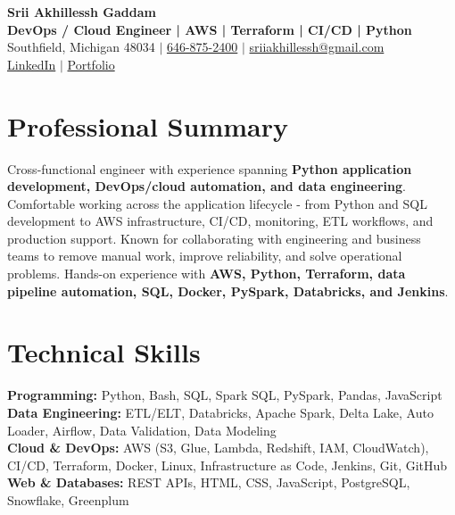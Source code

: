 \documentclass[letterpaper,10pt]{article}
\begin{document}
\fontsize{9.35pt}{10.45pt}\selectfont

\begin{center}
    {\LARGE \textbf{Srii Akhillessh Gaddam}} \\[-1pt]
    \textbf{DevOps / Cloud Engineer | AWS | Terraform | CI/CD | Python} \\[2pt]
    Southfield, Michigan 48034 $|$
    \href{tel:6468752400}{646-875-2400} $|$
    \href{mailto:sriiakhillessh@gmail.com}{sriiakhillessh@gmail.com} \\[1pt]
    \href{https://www.linkedin.com/in/srii-akhiilessh-gaddam-b48668191/}{LinkedIn} $|$
    \href{https://sriiakhillesshg.github.io/portfolio/}{Portfolio}
\end{center}
\vspace{-8pt}

\section{Professional Summary}
\small{Cross-functional engineer with experience spanning \textbf{Python application development, DevOps/cloud automation, and data engineering}. Comfortable working across the application lifecycle - from Python and SQL development to AWS infrastructure, CI/CD, monitoring, ETL workflows, and production support. Known for collaborating with engineering and business teams to remove manual work, improve reliability, and solve operational problems. Hands-on experience with \textbf{AWS, Python, Terraform, data pipeline automation, SQL, Docker, PySpark, Databricks, and Jenkins}.}

\section{Technical Skills}
\small{
\textbf{Programming:} Python, Bash, SQL, Spark SQL, PySpark, Pandas, JavaScript \\
\textbf{Data Engineering:} ETL/ELT, Databricks, Apache Spark, Delta Lake, Auto Loader, Airflow, Data Validation, Data Modeling \\
\textbf{Cloud \& DevOps:} AWS (S3, Glue, Lambda, Redshift, IAM, CloudWatch), CI/CD, Terraform, Docker, Linux, Infrastructure as Code, Jenkins, Git, GitHub \\
\textbf{Web \& Databases:} REST APIs, HTML, CSS, JavaScript, PostgreSQL, Snowflake, Greenplum
}
\end{document}

